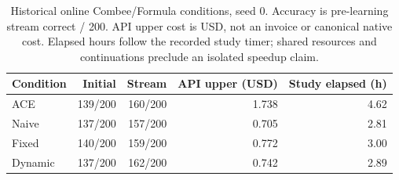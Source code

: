 \begin{table}[t]
\caption{Historical online Combee/Formula conditions, seed 0. Accuracy is pre-learning stream correct / 200. API upper cost is USD, not an invoice or canonical native cost. Elapsed hours follow the recorded study timer; shared resources and continuations preclude an isolated speedup claim.}
\label{tab:combee}
\small
\centering
\begin{tabular}{@{}lrrrr@{}}
\toprule
Condition & Initial & Stream & API upper (USD) & Study elapsed (h) \\
\midrule
ACE & 139/200 & 160/200 & 1.738 & 4.62 \\
Naive & 137/200 & 157/200 & 0.705 & 2.81 \\
Fixed & 140/200 & 159/200 & 0.772 & 3.00 \\
Dynamic & 137/200 & 162/200 & 0.742 & 2.89 \\
\bottomrule
\end{tabular}
\end{table}
